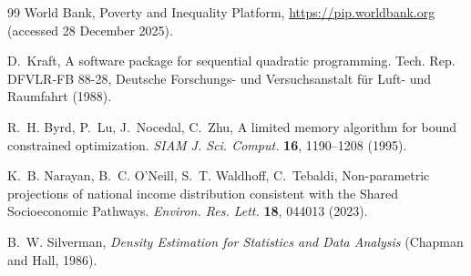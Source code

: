 \documentclass[11pt]{article}
\begin{document}
\begin{thebibliography}{99}
World Bank, Poverty and Inequality Platform, \url{https://pip.worldbank.org}
(accessed 28 December 2025).

D.~Kraft, A software package for sequential quadratic programming. Tech. Rep.
DFVLR-FB 88-28, Deutsche Forschungs- und Versuchsanstalt f\"ur Luft- und Raumfahrt (1988).

R.~H. Byrd, P.~Lu, J.~Nocedal, C.~Zhu, A limited memory algorithm for bound
constrained optimization. \emph{SIAM J. Sci. Comput.} \textbf{16}, 1190--1208
(1995).

K.~B. Narayan, B.~C. O'Neill, S.~T. Waldhoff, C.~Tebaldi, Non-parametric
projections of national income distribution consistent with the Shared
Socioeconomic Pathways. \emph{Environ. Res. Lett.} \textbf{18}, 044013 (2023).

B.~W. Silverman, \emph{Density Estimation for Statistics and Data Analysis}
(Chapman and Hall, 1986).

\end{thebibliography}
\end{document}
